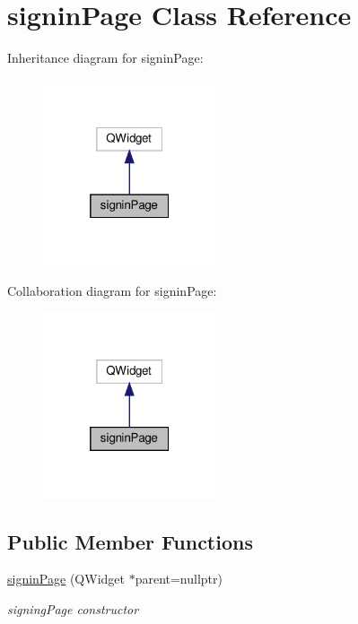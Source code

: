 \hypertarget{classsigninPage}{}\section{signin\+Page Class Reference}
\label{classsigninPage}


Inheritance diagram for signin\+Page\+:
\nopagebreak
\begin{figure}[H]
\begin{center}
\leavevmode
\includegraphics[width=145pt]{classsigninPage__inherit__graph}
\end{center}
\end{figure}


Collaboration diagram for signin\+Page\+:
\nopagebreak
\begin{figure}[H]
\begin{center}
\leavevmode
\includegraphics[width=145pt]{classsigninPage__coll__graph}
\end{center}
\end{figure}
\subsection*{Public Member Functions}
\begin{DoxyCompactItemize}
\item 
\hyperlink{classsigninPage_afb7dd0785bd1293840c5657b865ad841}{signin\+Page} (Q\+Widget $\ast$parent=nullptr)
\begin{DoxyCompactList}\small\item\em signing\+Page constructor \end{DoxyCompactList}\end{DoxyCompactItemize}


